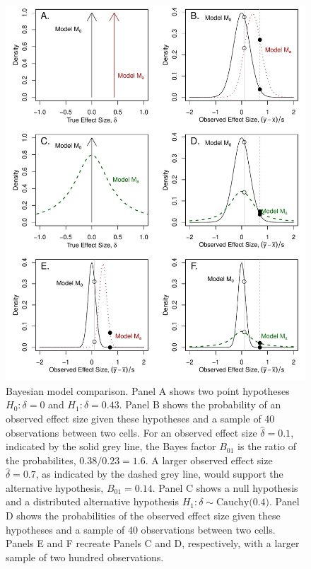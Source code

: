 \documentclass[man]{apa6}
\begin{document}

\begin{figure}
\includegraphics[width=\textwidth, keepaspectratio]{BFfigure.pdf}
\caption{Bayesian model comparison. Panel A shows two point hypotheses $H_0: \delta = 0$ and $H_1: \delta=0.43$. Panel B shows the probability of an observed effect size given these hypotheses and a sample of 40 observations between two cells. For an observed effect size $\hat{\delta} = 0.1$, indicated by the solid grey line, the Bayes factor $B_{01}$ is the ratio of the probabilites, $0.38 / 0.23 = 1.6$. A larger observed effect size $\hat{\delta} = 0.7$, as indicated by the dashed grey line, would support the alternative hypothesis, $B_{01} = 0.14$. Panel C shows a null hypothesis and a distributed alternative hypothesis $H_1: \delta \sim \mbox{Cauchy(0.4)}$. Panel D shows the probabilities of the observed effect size given these hypotheses and a sample of 40 observations between two cells. Panels E and F recreate Panels C and D, respectively, with a larger sample of two hundred observations.}
\label{BFfig}
\end{figure}
\end{document}
